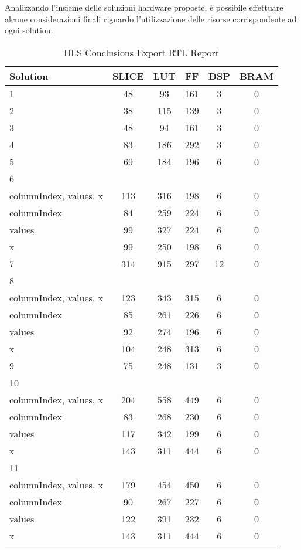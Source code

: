 Analizzando l'insieme delle soluzioni hardware proposte, è possibile effettuare alcune considerazioni finali riguardo l'utilizzazione delle risorse corrispondente ad ogni solution. 

\begin{table}[H]
	\centering
	\begin{tabular}{|l|c|c|c|c|c|}
		\hline
		\textbf{Solution} & \textbf{SLICE} & \textbf{LUT} & \textbf{FF} & \textbf{DSP} & \textbf{BRAM} \\
		\hline
		1 & 48 & 93 & 161 & 3 & 0 \\
		\hline
		2 & 38 & 115 & 139 & 3 & 0 \\
		\hline
		3 & 48 & 94 & 161 & 3 & 0 \\
		\hline
		4 & 83 & 186 & 292 & 3 & 0 \\
		\hline
		5 & 69 & 184 & 196 & 6 & 0 \\
		\hline
		6 &  &  &  &  & \\
		\tabitem columnIndex, values, x & 113 & 316 & 198 & 6 & 0 \\
		\tabitem columnIndex & 84 & 259 & 224 & 6 & 0 \\
		\tabitem values & 99 & 327 & 224 & 6 & 0 \\
		\tabitem x & 99 & 250 & 198 & 6 & 0 \\
		\hline
		7 & 314 & 915 & 297 & 12 & 0 \\
		\hline
		8 &  &  &  &  &  \\
		\tabitem columnIndex, values, x & 123 & 343 & 315 & 6 & 0 \\
		\tabitem columnIndex & 85 & 261 & 226 & 6 & 0 \\
		\tabitem values & 92 & 274 & 196 & 6 & 0 \\
		\tabitem x & 104 & 248 & 313 & 6 & 0 \\
		\hline
		9 & 75 & 248 & 131 & 3 & 0 \\
		\hline
		10 &  &  &  &  &  \\
		\tabitem columnIndex, values, x & 204 & 558 & 449 & 6 & 0 \\
		\tabitem columnIndex & 83 & 268 & 230 & 6 & 0 \\
		\tabitem values & 117 & 342 & 199 & 6 & 0 \\
		\tabitem x & 143 & 311 & 444 & 6 & 0 \\
		\hline
		11 &  &  &  &  &  \\
		\tabitem columnIndex, values, x & 179 & 454 & 450 & 6 & 0 \\
		\tabitem columnIndex & 90 & 267 & 227 & 6 & 0 \\
		\tabitem values & 122 & 391 & 232 & 6 & 0 \\
		\tabitem x & 143 & 311 & 444 & 6 & 0 \\
		\hline
	\end{tabular}
	\caption{HLS Conclusions Export RTL Report}
	\label{tab:hls-conclusions-export-rtl-report}
\end{table}

